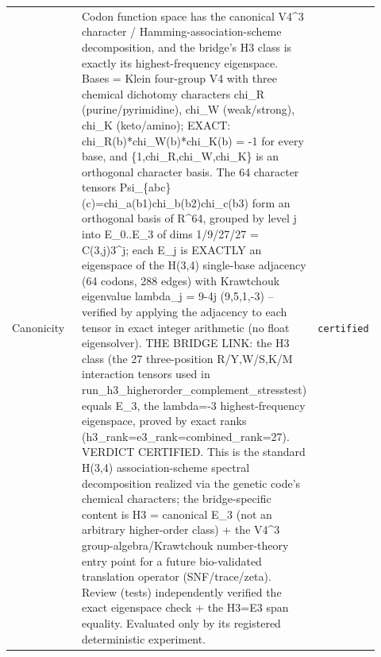 \begin{longtable}{>{\raggedright\arraybackslash}p{0.22\linewidth}>{\raggedright\arraybackslash}p{0.55\linewidth}>{\raggedright\arraybackslash}p{0.15\linewidth}}
Canonicity & Codon function space has the canonical V4\textasciicircum{}3 character / Hamming-association-scheme decomposition, and the bridge's H3 class is exactly its highest-frequency eigenspace. Bases = Klein four-group V4 with three chemical dichotomy characters chi\_R (purine/pyrimidine), chi\_W (weak/strong), chi\_K (keto/amino); EXACT: chi\_R(b)*chi\_W(b)*chi\_K(b) = -1 for every base, and \{1,chi\_R,chi\_W,chi\_K\} is an orthogonal character basis. The 64 character tensors Psi\_\{abc\}(c)=chi\_a(b1)chi\_b(b2)chi\_c(b3) form an orthogonal basis of R\textasciicircum{}64, grouped by level j into E\_0..E\_3 of dims 1/9/27/27 = C(3,j)3\textasciicircum{}j; each E\_j is EXACTLY an eigenspace of the H(3,4) single-base adjacency (64 codons, 288 edges) with Krawtchouk eigenvalue lambda\_j = 9-4j (9,5,1,-3) -- verified by applying the adjacency to each tensor in exact integer arithmetic (no float eigensolver). THE BRIDGE LINK: the H3 class (the 27 three-position R/Y,W/S,K/M interaction tensors used in run\_h3\_higherorder\_complement\_stresstest) equals E\_3, the lambda=-3 highest-frequency eigenspace, proved by exact ranks (h3\_rank=e3\_rank=combined\_rank=27). VERDICT CERTIFIED. This is the standard H(3,4) association-scheme spectral decomposition realized via the genetic code's chemical characters; the bridge-specific content is H3 = canonical E\_3 (not an arbitrary higher-order class) + the V4\textasciicircum{}3 group-algebra/Krawtchouk number-theory entry point for a future bio-validated translation operator (SNF/trace/zeta). Review (tests) independently verified the exact eigenspace check + the H3=E3 span equality. Evaluated only by its registered deterministic experiment. & \texttt{certified} \\

\end{longtable}
